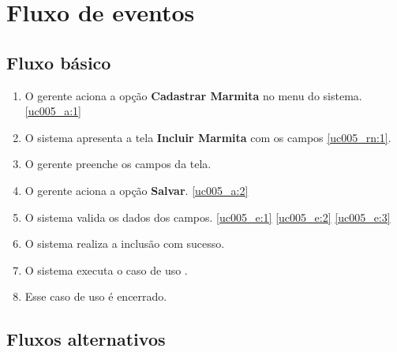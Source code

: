 \section{Fluxo de eventos}

\subsection{Fluxo básico}

\begin{enumerate}[label=P\arabic*]
	\item O gerente aciona a opção \textbf{Cadastrar Marmita} no menu do sistema. \label{uc005_p:1}\ref{uc005_a:1}
	\item O sistema apresenta a tela \textbf{Incluir Marmita} com os campos \ref{uc005_rn:1}. \label{uc005_p:2}
	\item O gerente preenche os campos da tela. \label{uc005_p:3}
	\item O gerente aciona a opção \textbf{Salvar}. \label{uc005_p:4}\ref{uc005_a:2}
	\item O sistema valida os dados dos campos. \ref{uc005_e:1} \ref{uc005_e:2} \ref{uc005_e:3}
	\item O sistema realiza a inclusão com sucesso.
	\item O sistema executa o caso de uso .
	\item Esse caso de uso é encerrado.	
\end{enumerate}

\subsection{Fluxos alternativos}

